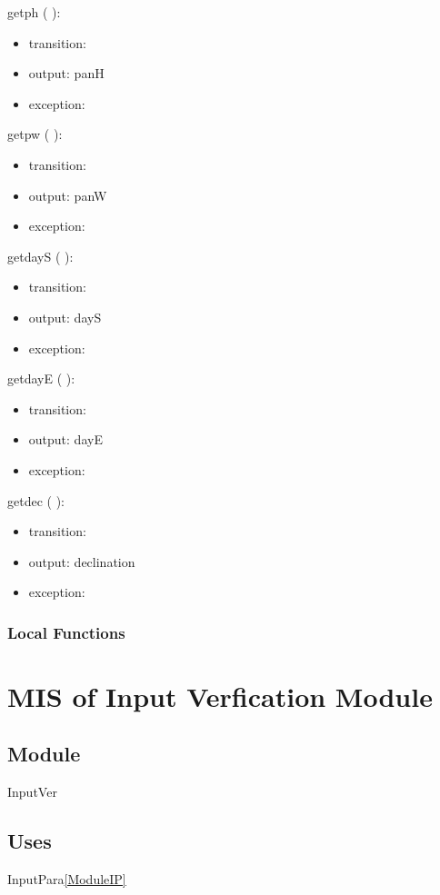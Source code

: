 \documentclass[12pt, titlepage]{article}
\begin{document}
\noindent  getph ( ):
\begin{itemize}
\item transition: 
\item output: panH
\item exception: 
\end{itemize}

\noindent  getpw ( ):
\begin{itemize}
\item transition: 
\item output: panW
\item exception: 
\end{itemize}

\noindent  getdayS ( ):
\begin{itemize}
\item transition: 
\item output: dayS
\item exception: 
\end{itemize}

\noindent  getdayE ( ):
\begin{itemize}
\item transition: 
\item output: dayE
\item exception: 
\end{itemize}

\noindent  getdec ( ):
\begin{itemize}
\item transition: 
\item output: declination
\item exception: 
\end{itemize}

\subsubsection{Local Functions}

\section{MIS of Input Verfication Module} \label{ModuleIV} 

\subsection{Module}
InputVer

\subsection{Uses}
InputPara\ref{ModuleIP}
\end{document}
